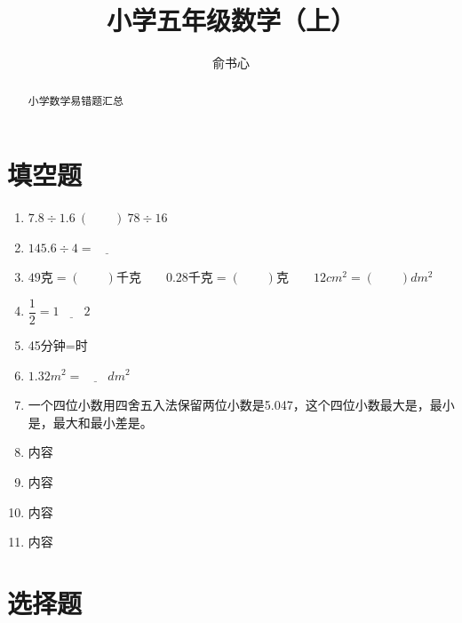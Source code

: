 \documentclass[UTF8,a4paper,11pt]{article}
\title{小学五年级数学（上） }
\author{俞书心}
\begin{document}
\begin{CJK}{UTF8}{gbsn}
\maketitle
\tableofcontents

\begin{abstract}
小学数学易错题汇总
\end{abstract}

\newpage
\section{填空题}

\makeatletter 
\def\zdyxh#1{\expandafter\@zdyxh\csname c@#1\endcsname} 
\def\@zdyxh#1{%
\ifcase#1\or 1\or 2\or 3\or 4\or 5\or 6\or 7\or 8\or 9\or 10\or 11\or 12\or 13\or 14\or 15\or 16\else 超了\fi} 
\makeatother 
{} 
\begin{enumerate}[label=\zdyxh*.] 
\item \begin{math}
 7.8\div1.6\ (\qquad  )\ 78 \div16 
\end{math}
\item $145.6\div 4 = \underline{\qquad}$
\item $49\mbox{克}= (\qquad )\mbox{千克} \qquad 0.28\mbox{千克}=(  \qquad)\mbox{克} \qquad 12cm^2=( \qquad)dm^2 $
\item $\dfrac{1}{2}=1\underline{\qquad     }2$
\item 45分钟=\underline{\qquad     }时
\item $1.32m^2=\underline{\qquad     }dm^2 $
\item 一个四位小数用四舍五入法保留两位小数是5.047，这个四位小数最大是\underline{\qquad\qquad }，最小是\underline{\qquad\qquad }，最大和最小差是\underline{\qquad\qquad }。 
\item 内容 
\item 内容 
\item 内容
\item 内容

\end{enumerate}


\section{选择题}




\end{CJK}
\end{document}
